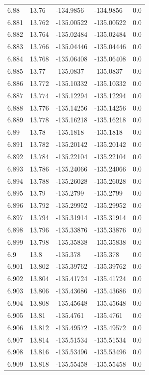 \begin{tabular}{lllll}
6.88 & 13.76 & -134.9856 & -134.9856 & 0.0 \\
6.881 & 13.762 & -135.00522 & -135.00522 & 0.0 \\
6.882 & 13.764 & -135.02484 & -135.02484 & 0.0 \\
6.883 & 13.766 & -135.04446 & -135.04446 & 0.0 \\
6.884 & 13.768 & -135.06408 & -135.06408 & 0.0 \\
6.885 & 13.77 & -135.0837 & -135.0837 & 0.0 \\
6.886 & 13.772 & -135.10332 & -135.10332 & 0.0 \\
6.887 & 13.774 & -135.12294 & -135.12294 & 0.0 \\
6.888 & 13.776 & -135.14256 & -135.14256 & 0.0 \\
6.889 & 13.778 & -135.16218 & -135.16218 & 0.0 \\
6.89 & 13.78 & -135.1818 & -135.1818 & 0.0 \\
6.891 & 13.782 & -135.20142 & -135.20142 & 0.0 \\
6.892 & 13.784 & -135.22104 & -135.22104 & 0.0 \\
6.893 & 13.786 & -135.24066 & -135.24066 & 0.0 \\
6.894 & 13.788 & -135.26028 & -135.26028 & 0.0 \\
6.895 & 13.79 & -135.2799 & -135.2799 & 0.0 \\
6.896 & 13.792 & -135.29952 & -135.29952 & 0.0 \\
6.897 & 13.794 & -135.31914 & -135.31914 & 0.0 \\
6.898 & 13.796 & -135.33876 & -135.33876 & 0.0 \\
6.899 & 13.798 & -135.35838 & -135.35838 & 0.0 \\
6.9 & 13.8 & -135.378 & -135.378 & 0.0 \\
6.901 & 13.802 & -135.39762 & -135.39762 & 0.0 \\
6.902 & 13.804 & -135.41724 & -135.41724 & 0.0 \\
6.903 & 13.806 & -135.43686 & -135.43686 & 0.0 \\
6.904 & 13.808 & -135.45648 & -135.45648 & 0.0 \\
6.905 & 13.81 & -135.4761 & -135.4761 & 0.0 \\
6.906 & 13.812 & -135.49572 & -135.49572 & 0.0 \\
6.907 & 13.814 & -135.51534 & -135.51534 & 0.0 \\
6.908 & 13.816 & -135.53496 & -135.53496 & 0.0 \\
6.909 & 13.818 & -135.55458 & -135.55458 & 0.0 \\

\end{tabular}
